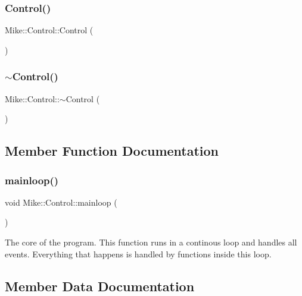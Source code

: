 \subsubsection{\texorpdfstring{Control()}{Control()}}
{\footnotesize\ttfamily Mike\+::\+Control\+::\+Control (\begin{DoxyParamCaption}{ }\end{DoxyParamCaption})}

\mbox{\label{class_mike_1_1_control_aa3395e0509ab5b980732ab0e3a29ce4d}} 
\subsubsection{\texorpdfstring{$\sim$\+Control()}{~Control()}}
{\footnotesize\ttfamily Mike\+::\+Control\+::$\sim$\+Control (\begin{DoxyParamCaption}{ }\end{DoxyParamCaption})}



\subsection{Member Function Documentation}
\mbox{\label{class_mike_1_1_control_a3440083f03f7da3d4490fa44bc13d62b}} 
\subsubsection{\texorpdfstring{mainloop()}{mainloop()}}
{\footnotesize\ttfamily void Mike\+::\+Control\+::mainloop (\begin{DoxyParamCaption}{ }\end{DoxyParamCaption})\hspace{0.3cm}{\ttfamily [private]}}

The core of the program. This function runs in a continous loop and handles all events. Everything that happens is handled by functions inside this loop. 

\subsection{Member Data Documentation}
\mbox{\label{class_mike_1_1_control_a61d38447360ba0baa9ac8a3607de0c5b}} 
